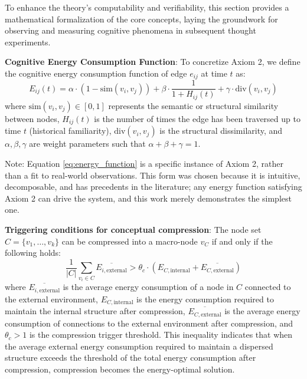 \documentclass[10pt,onecolumn]{article}
\begin{document}
To enhance the theory’s computability and verifiability, this section provides a mathematical formalization of the core concepts, laying the groundwork for observing and measuring cognitive phenomena in subsequent thought experiments.

\textbf{Cognitive Energy Consumption Function}: To concretize Axiom 2, we define the cognitive energy consumption function of edge $e_{ij}$ at time $t$ as:
\begin{equation}
E_{ij}(t) = \alpha \cdot (1 - \text{sim}(v_i, v_j)) + \beta \cdot \frac{1}{1 + H_{ij}(t)} + \gamma \cdot \text{div}(v_i, v_j)
\label{eq:energy_function}
\end{equation}
where $\text{sim}(v_i, v_j) \in [0,1]$ represents the semantic or structural similarity between nodes, $H_{ij}(t)$ is the number of times the edge has been traversed up to time $t$ (historical familiarity), $\text{div}(v_i, v_j)$ is the structural dissimilarity, and $\alpha, \beta, \gamma$ are weight parameters such that $\alpha + \beta + \gamma = 1$.
\begin{small}
    Note: Equation \eqref{eq:energy_function} is a specific instance of Axiom 2, rather than a fit to real-world observations. This form was chosen because it is intuitive, decomposable, and has precedents in the literature; any energy function satisfying Axiom 2 can drive the system, and this work merely demonstrates the simplest one.
\end{small}

\textbf{Triggering conditions for conceptual compression}: The node set $C = \{v_1, \ldots, v_k\}$ can be compressed into a macro-node $v_C$ if and only if the following holds:
\begin{equation}
\frac{1}{|C|}\sum_{v_i \in C} \overline{E_{i, \text{external}}} > \theta_c \cdot (E_{C, \text{internal}} + \overline{E_{C, \text{external}}})
\label{eq:compression_condition}
\end{equation}
where $\overline{E_{i, \text{external}}}$ is the average energy consumption of a node in $C$ connected to the external environment, $E_{C, \text{internal}}$ is the energy consumption required to maintain the internal structure after compression, $\overline{E_{C, \text{external}}}$ is the average energy consumption of connections to the external environment after compression, and $\theta_c > 1$ is the compression trigger threshold. This inequality indicates that when the average external energy consumption required to maintain a dispersed structure exceeds the threshold of the total energy consumption after compression, compression becomes the energy-optimal solution.
\end{document}
